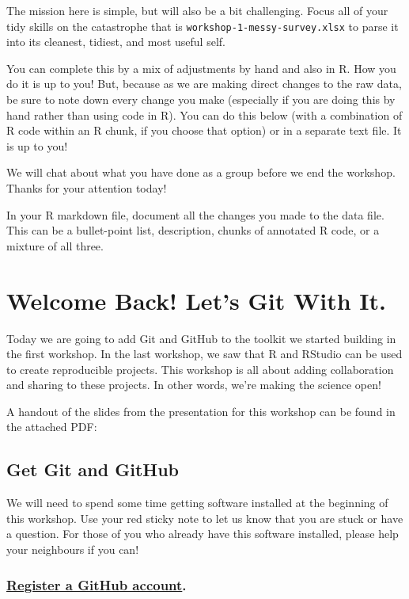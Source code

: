 \documentclass[
]{book}
\begin{document}
The mission here is simple, but will also be a bit challenging. Focus all of your tidy skills on the catastrophe that is \texttt{workshop-1-messy-survey.xlsx} to parse it into its cleanest, tidiest, and most useful self.

You can complete this by a mix of adjustments by hand and also in R. How you do it is up to you! But, because as we are making direct changes to the raw data, be sure to note down every change you make (especially if you are doing this by hand rather than using code in R). You can do this below (with a combination of R code within an R chunk, if you choose that option) or in a separate text file. It is up to you!

We will chat about what you have done as a group before we end the workshop. Thanks for your attention today!

In your R markdown file, document all the changes you made to the data file. This can be a bullet-point list, description, chunks of annotated R code, or a mixture of all three.

\chapter{Welcome Back! Let's Git With It.}\label{welcome-back-lets-git-with-it.}

Today we are going to add Git and GitHub to the toolkit we started building in the first workshop. In the last workshop, we saw that R and RStudio can be used to create reproducible projects. This workshop is all about adding collaboration and sharing to these projects. In other words, we're making the science open!

A handout of the slides from the presentation for this workshop can be found in the attached PDF:

\section{Get Git and GitHub}\label{get-git-and-github}

We will need to spend some time getting software installed at the beginning of this workshop. Use your red sticky note to let us know that you are stuck or have a question. For those of you who already have this software installed, please help your neighbours if you can!

\subsection{\texorpdfstring{\href{https://github.com/signup?ref_cta=Sign+up&ref_loc=header+logged+out&ref_page=\%2F&source=header-home}{Register a GitHub account}.}{Register a GitHub account.}}\label{register-a-github-account.}
\end{document}
